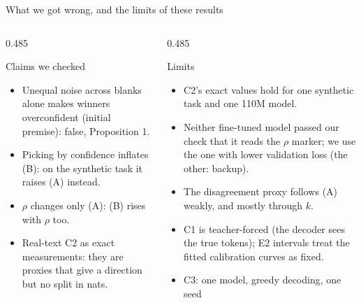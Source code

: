 \documentclass[aspectratio=169,10pt,t]{beamer}
\newcommand{\A}{{\color{dep}\firasemibold (A)}\xspace}
\newcommand{\B}{{\color{est}\firasemibold (B)}\xspace}
\newcommand{\paneltitle}[1]{{\color{accentdark}\small\firasemibold #1}\par\vspace{0.8mm}}
\begin{document}
\begin{frame}{What we got wrong, and the limits of these results}
  \vspace{1mm}
  \begin{columns}[T,onlytextwidth]
    \begin{column}{0.485\textwidth}
      \begin{panel}[height=60mm]
        \paneltitle{Claims we checked}
        \begin{itemize}\scriptsize
          \item Unequal noise across blanks alone makes winners overconfident (initial premise):
                false, Proposition 1.
          \item Picking by confidence inflates \B: on the synthetic
                task it raises \A instead.
          \item $\rho$ changes only \A: \B rises with $\rho$ too.
          \item Real-text C2 as exact measurements: they are proxies that give a
                direction but no split in nats.
        \end{itemize}
      \end{panel}
    \end{column}
    \begin{column}{0.485\textwidth}
      \begin{panel}[height=60mm]
        \paneltitle{Limits}
        \begin{itemize}\scriptsize
          \item C2's exact values hold for one synthetic task and one 110M model.
          \item Neither fine-tuned model passed our check that it reads the $\rho$ marker; we use
                the one with lower validation loss (the other: backup).
          \item The disagreement proxy follows \A weakly, and mostly through $k$.
          \item C1 is teacher-forced (the decoder sees the true tokens); E2 intervals treat
                the fitted calibration curves as fixed.
          \item C3: one model, greedy decoding, one seed
        \end{itemize}
      \end{panel}
    \end{column}
  \end{columns}
\end{frame}
\end{document}
